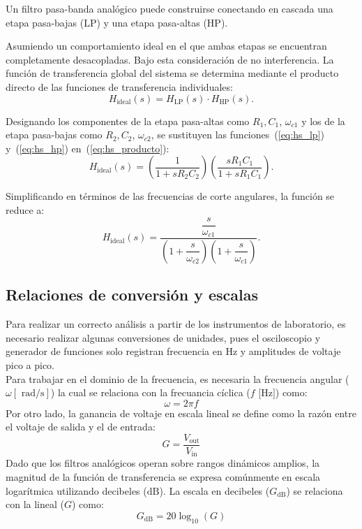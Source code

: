 \documentclass[twocolumn]{article}
\begin{document}
Un filtro pasa-banda analógico puede construirse conectando en cascada una etapa pasa-bajas (LP) y una etapa pasa-altas (HP).

Asumiendo un comportamiento ideal en el que ambas etapas se encuentran completamente desacopladas. Bajo esta consideración de no interferencia. La función de transferencia global del sistema se determina mediante el producto directo de las funciones de transferencia individuales:
\begin{equation}
H_{\text{ideal}}(s) = H_{\text{LP}}(s) \cdot H_{\text{HP}}(s).
\label{eq:hs_producto}
\end{equation}

Designando los componentes de la etapa pasa-altas como $R_1, C_1$, $\omega_{c1}$ y los de la etapa pasa-bajas como $R_2, C_2$, $\omega_{c2}$, se sustituyen las funciones~(\ref{eq:hs_lp}) y~(\ref{eq:hs_hp}) en~(\ref{eq:hs_producto}):
\begin{equation}
H_{\text{ideal}}(s) = \left( \frac{1}{1 + s R_2 C_2} \right) \left( \frac{s R_1 C_1}{1 + s R_1 C_1} \right).
\end{equation}

Simplificando en términos de las frecuencias de corte angulares, la función se reduce a:
\begin{equation}
H_{\text{ideal}}(s) = \frac{\dfrac{s}{\omega_{c1}}}{\left(1 + \dfrac{s}{\omega_{c2}}\right)\left(1 + \dfrac{s}{\omega_{c1}}\right)}.
\label{eq:hs_ideal_canonica}
\end{equation}

\subsection{Relaciones de conversión y escalas}
Para realizar un correcto análisis a partir de los instrumentos de laboratorio, es necesario realizar algunas conversiones de unidades, pues el osciloscopio y generador de funciones solo registran frecuencia en Hz y amplitudes de voltaje pico a pico.\\
Para trabajar en el dominio de la frecuencia, es necesaria la frecuencia angular ($\omega [\text{~rad/s}]$) la cual se relaciona con la frecuancia cíclica ($f\text{~[Hz]}$) como:
\begin{equation}
  \omega = 2\pi f
  \label{eq:conver_w-f}
\end{equation}
Por otro lado, la ganancia de voltaje en escala lineal se define como la razón entre el voltaje de salida y el de entrada:
\begin{equation*}
  G = \frac{V_{\text{out}}}{V_{\text{in}}}
\end{equation*}
Dado que los filtros analógicos operan sobre rangos dinámicos amplios, la magnitud de la función de transferencia se expresa comúnmente en escala logarítmica utilizando decibeles ($\text{dB}$). La escala en decibeles ($G_{\text{dB}}$) se relaciona con la lineal ($G$) como:
\begin{equation}
  G_{\text{dB}} = 20\log_{10}(G)
    \label{eq:conver_lineal-dB}
\end{equation}
\end{document}
